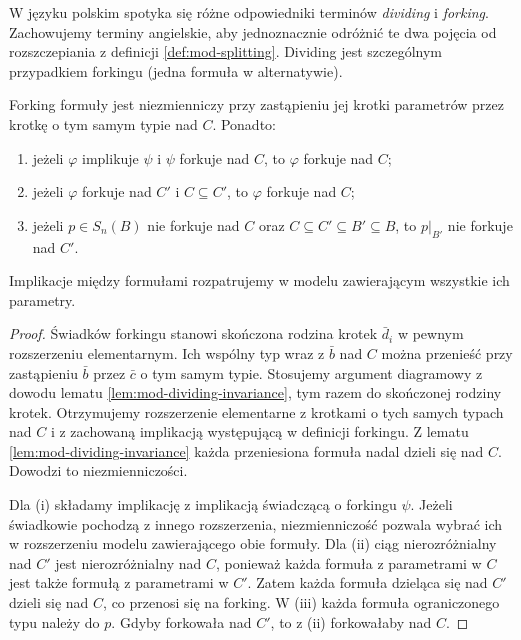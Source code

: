 W języku polskim spotyka się różne odpowiedniki
terminów \emph{dividing} i \emph{forking}.
Zachowujemy terminy angielskie, aby jednoznacznie
odróżnić te dwa pojęcia od rozszczepiania
z definicji \ref{def:mod-splitting}.
Dividing jest szczególnym przypadkiem forkingu
(jedna formuła w alternatywie).

\begin{lemat}
\label{lem:mod-forking-basic}
Forking formuły jest niezmienniczy przy zastąpieniu
jej krotki parametrów przez krotkę o tym samym
typie nad $C$.
Ponadto:
\begin{enumerate}[label=(\roman*)]
\item jeżeli $\varphi$ implikuje $\psi$ i $\psi$
forkuje nad $C$, to $\varphi$ forkuje nad $C$;
\item jeżeli $\varphi$ forkuje nad $C'$ i
$C\subseteq C'$, to $\varphi$ forkuje nad $C$;
\item jeżeli $p\in S_n(B)$ nie forkuje nad $C$
oraz $C\subseteq C'\subseteq B'\subseteq B$,
to $p|_{B'}$ nie forkuje nad $C'$.
\end{enumerate}
Implikacje między formułami rozpatrujemy w modelu
zawierającym wszystkie ich parametry.
\end{lemat}
\begin{proof}
Świadków forkingu stanowi skończona rodzina
krotek $\bar d_i$ w pewnym rozszerzeniu
elementarnym. Ich wspólny typ wraz z $\bar b$
nad $C$ można przenieść przy zastąpieniu
$\bar b$ przez $\bar c$ o tym samym typie.
Stosujemy argument diagramowy z dowodu
lematu \ref{lem:mod-dividing-invariance},
tym razem do skończonej rodziny krotek.
Otrzymujemy rozszerzenie elementarne z krotkami
o tych samych typach nad $C$ i z zachowaną
implikacją występującą w definicji forkingu.
Z lematu \ref{lem:mod-dividing-invariance}
każda przeniesiona formuła nadal dzieli się
nad $C$. Dowodzi to niezmienniczości.

Dla (i) składamy implikację z implikacją
świadczącą o forkingu $\psi$.
Jeżeli świadkowie pochodzą z innego rozszerzenia,
niezmienniczość pozwala wybrać ich w rozszerzeniu
modelu zawierającego obie formuły.
Dla (ii) ciąg nierozróżnialny nad $C'$
jest nierozróżnialny nad $C$, ponieważ każda
formuła z parametrami w $C$ jest także formułą
z parametrami w $C'$. Zatem każda formuła
dzieląca się nad $C'$ dzieli się nad $C$,
co przenosi się na forking.
W (iii) każda formuła ograniczonego typu
należy do $p$. Gdyby forkowała nad $C'$,
to z (ii) forkowałaby nad $C$.
\end{proof}

